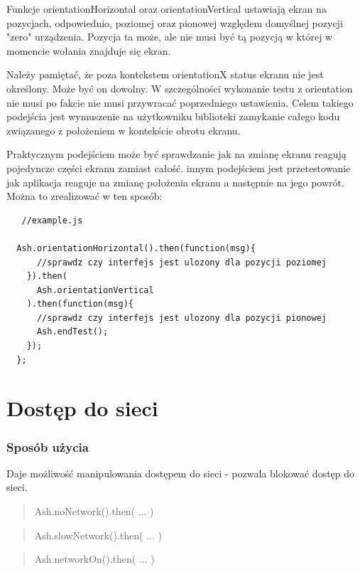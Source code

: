 \documentclass[brudnopis]{xmgr}
\begin{document}
Funkcje orientationHorizontal oraz orientationVertical  ustawiają ekran na pozycjach, odpowiednio, poziomej oraz pionowej względem domyślnej pozycji "zero" urządzenia. Pozycja ta może, ale nie musi być tą pozycją w której w momencie wołania znajduje się ekran.  

Należy pamiętać, że poza kontekstem orientationX status ekranu nie jest określony. Może być on dowolny. W szczególności wykonanie testu z orientation nie musi po fakcie nie musi przywracać poprzedniego ustawienia. Celem takiego podejścia jest wymuszenie na użytkowniku biblioteki zamykanie całego kodu związanego z położeniem w kontekście obrotu ekranu. 

Praktycznym podejściem może być sprawdzanie jak na zmianę ekranu reagują pojedyncze części ekranu zamiast całość. innym podejściem jest przetestowanie jak aplikacja reaguje na zmianę położenia ekranu a następnie na jego powrót. Można to zrealizować w ten sposób:

\begin{lstlisting}
   //example.js

  Ash.orientationHorizontal().then(function(msg){
      //sprawdz czy interfejs jest ulozony dla pozycji poziomej
    }).then(
      Ash.orientationVertical
    ).then(function(msg){
      //sprawdz czy interfejs jest ulozony dla pozycji pionowej
      Ash.endTest();
    });
  };
\end{lstlisting}

\section{Dostęp do sieci}

\subsubsection{Sposób użycia}

Daje możliwość manipulowania dostępem do sieci - pozwala blokować dostęp do sieci.

\begin{quote}
Ash.noNetwork().then( ... ) 
\end{quote}

\begin{quote}
Ash.slowNetwork().then( ... ) 
\end{quote}

\begin{quote}
Ash.networkOn().then( ... ) 
\end{quote}
\end{document}
